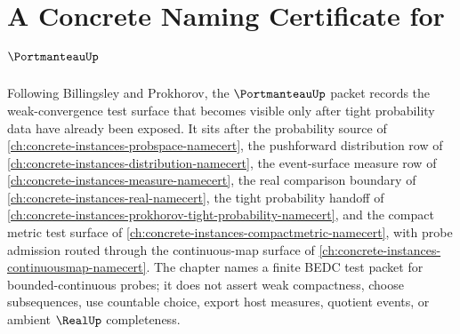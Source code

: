 \chapter{A Concrete Naming Certificate for $\PortmanteauUp$}
\label{ch:concrete-instances-portmanteau-namecert}

Following Billingsley and Prokhorov, the $\PortmanteauUp$ packet records the weak-convergence test surface that becomes visible only after tight probability data have already been exposed. It sits after the probability source of \autoref{ch:concrete-instances-probspace-namecert}, the pushforward distribution row of \autoref{ch:concrete-instances-distribution-namecert}, the event-surface measure row of \autoref{ch:concrete-instances-measure-namecert}, the real comparison boundary of \autoref{ch:concrete-instances-real-namecert}, the tight probability handoff of \autoref{ch:concrete-instances-prokhorov-tight-probability-namecert}, and the compact metric test surface of \autoref{ch:concrete-instances-compactmetric-namecert}, with probe admission routed through the continuous-map surface of \autoref{ch:concrete-instances-continuousmap-namecert}. The chapter names a finite BEDC test packet for bounded-continuous probes; it does not assert weak compactness, choose subsequences, use countable choice, export host measures, quotient events, or ambient $\RealUp$ completeness.

